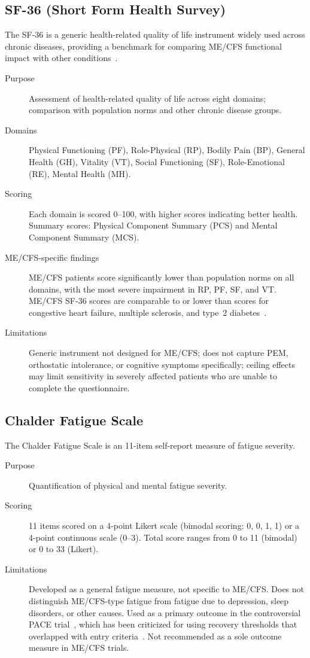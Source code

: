 \subsection{SF-36 (Short Form Health Survey)}

The SF-36 is a generic health-related quality of life instrument widely used across chronic diseases, providing a benchmark for comparing ME/CFS functional impact with other conditions~\cite{kingdon2018functional}.

\begin{description}
\item[Purpose] Assessment of health-related quality of life across eight domains; comparison with population norms and other chronic disease groups.
\item[Domains] Physical Functioning (PF), Role-Physical (RP), Bodily Pain (BP), General Health (GH), Vitality (VT), Social Functioning (SF), Role-Emotional (RE), Mental Health (MH).
\item[Scoring] Each domain is scored 0--100, with higher scores indicating better health. Summary scores: Physical Component Summary (PCS) and Mental Component Summary (MCS).
\item[ME/CFS-specific findings] ME/CFS patients score significantly lower than population norms on all domains, with the most severe impairment in RP, PF, SF, and VT. ME/CFS SF-36 scores are comparable to or lower than scores for congestive heart failure, multiple sclerosis, and type~2 diabetes~\cite{kingdon2018functional,hvidberg2015quality}.
\item[Limitations] Generic instrument not designed for ME/CFS; does not capture PEM, orthostatic intolerance, or cognitive symptoms specifically; ceiling effects may limit sensitivity in severely affected patients who are unable to complete the questionnaire.
\end{description}

\subsection{Chalder Fatigue Scale}

The Chalder Fatigue Scale is an 11-item self-report measure of fatigue severity.

\begin{description}
\item[Purpose] Quantification of physical and mental fatigue severity.
\item[Scoring] 11 items scored on a 4-point Likert scale (bimodal scoring: 0, 0, 1, 1) or a 4-point continuous scale (0--3). Total score ranges from 0 to 11 (bimodal) or 0 to 33 (Likert).
\item[Limitations] Developed as a general fatigue measure, not specific to ME/CFS. Does not distinguish ME/CFS-type fatigue from fatigue due to depression, sleep disorders, or other causes. Used as a primary outcome in the controversial PACE trial~\cite{White2011pace}, which has been criticized for using recovery thresholds that overlapped with entry criteria~\cite{geraghty2019cognitive}. Not recommended as a sole outcome measure in ME/CFS trials.
\end{description}

